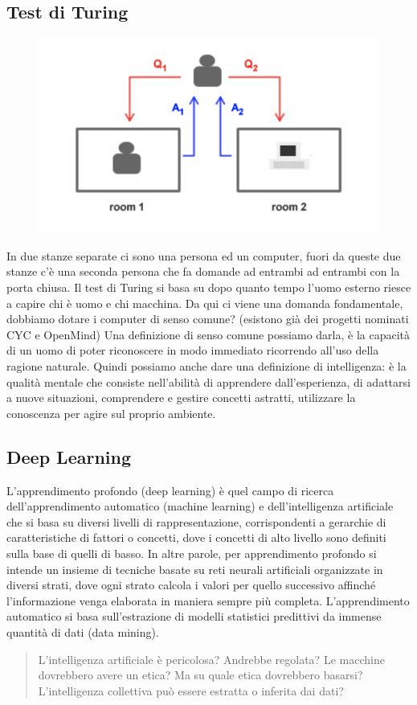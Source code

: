 \documentclass{article}
\begin{document}
\subsection{Test di Turing}
\begin{figure}[H]
    \centering
    \includegraphics[scale=0.4]{Images/testdituring.png}
\end{figure}
In due stanze separate ci sono una persona ed un computer, fuori da queste due stanze c'è una seconda persona che fa domande ad entrambi ad entrambi con la porta chiusa. Il test di Turing si basa su dopo quanto tempo l'uomo esterno riesce a capire chi è uomo e chi macchina. \newline
Da qui ci viene una domanda fondamentale, dobbiamo dotare i computer di senso comune? (esistono già dei progetti nominati CYC e OpenMind) Una definizione di senso comune possiamo darla, è la capacità di un uomo di poter riconoscere in modo immediato ricorrendo all'uso della ragione naturale. Quindi possiamo anche dare una definizione di intelligenza: è la qualità mentale che consiste nell'abilità di apprendere dall'esperienza, di adattarsi a nuove situazioni, comprendere e gestire concetti astratti, utilizzare la conoscenza per agire sul proprio ambiente.

\subsection{Deep Learning}
L'apprendimento profondo (deep learning) è quel campo di ricerca dell'apprendimento automatico (machine learning) e dell'intelligenza artificiale che si basa su diversi livelli di rappresentazione, corrispondenti a gerarchie di caratteristiche di fattori o concetti, dove i concetti di alto livello sono definiti sulla base di quelli di basso. In altre parole, per apprendimento profondo si intende un insieme di tecniche basate su reti neurali artificiali organizzate in diversi strati, dove ogni strato calcola i valori per quello successivo affinché l'informazione venga elaborata in maniera sempre più completa. L'apprendimento automatico si basa sull'estrazione di modelli statistici predittivi da immense quantità di dati (data mining).
\begin{quote}
    L'intelligenza artificiale è pericolosa? Andrebbe regolata? Le macchine dovrebbero avere un etica? Ma su quale etica dovrebbero basarsi? L'intelligenza collettiva può essere estratta o inferita dai dati?
\end{quote}
\end{document}
